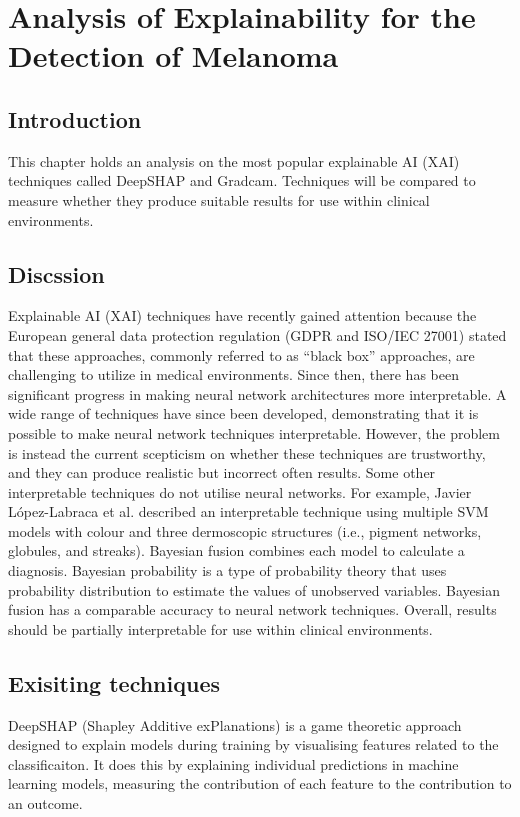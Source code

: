 \chapter{Analysis of Explainability for the Detection of Melanoma}

\section{Introduction}
This chapter holds an analysis on the most popular explainable AI (XAI) techniques called DeepSHAP and Gradcam. Techniques will be compared to measure whether they produce suitable results for use within clinical environments.

\section{Discssion}
Explainable AI (XAI) techniques have recently gained attention because the European general data protection regulation (GDPR and ISO/IEC 27001) stated that these approaches, commonly referred to as ``black box'' approaches, are challenging to utilize in medical environments. Since then, there has been significant progress in making neural network architectures more interpretable. A wide range of techniques\cite{Fuji2019,  Selvaraju2016, Ribeiro2016} have since been developed, demonstrating that it is possible to make neural network techniques interpretable. However, the problem is instead the current scepticism on whether these techniques are trustworthy\cite{Tjoa2019, Samek2019a}, and they can produce realistic but incorrect often results\cite{Ghorbani2019}. Some other interpretable techniques do not utilise neural networks. For example, Javier López-Labraca et al.\cite{Lopez-Labraca2018} described an interpretable technique using multiple SVM models with colour and three dermoscopic structures (i.e., pigment networks, globules, and streaks). Bayesian fusion combines each model to calculate a diagnosis. Bayesian probability is a type of probability theory that uses probability distribution to estimate the values of unobserved variables. Bayesian fusion has a comparable accuracy to neural network techniques\cite{Takruri2017}. Overall, results should be partially interpretable for use within clinical environments.


\section{Exisiting techniques}
DeepSHAP (Shapley Additive exPlanations) is a game theoretic approach designed to explain models during training by visualising features related to the classificaiton. It does this by explaining individual predictions in machine learning models, measuring the contribution of each feature to the contribution to an outcome\cite{Aas2021}.


